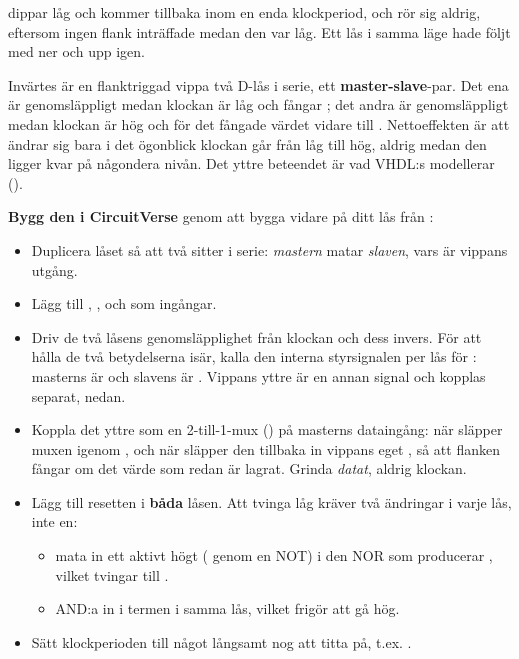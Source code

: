 
 dippar låg och kommer tillbaka inom en enda klockperiod, och  rör sig aldrig,
eftersom ingen flank inträffade medan den var låg. Ett lås i samma läge hade följt med ner och upp
igen.

Invärtes är en flanktriggad vippa två D-lås i serie, ett \textbf{master-slave}-par. Det ena är
genomsläppligt medan klockan är låg och fångar ; det andra är genomsläppligt medan klockan
är hög och för det fångade värdet vidare till . Nettoeffekten är att  ändrar sig
bara i det ögonblick klockan går från låg till hög, aldrig medan den ligger kvar på någondera
nivån. Det yttre beteendet är vad VHDL:s  modellerar
().

\textbf{Bygg den i CircuitVerse} genom att bygga vidare på ditt lås från :
\begin{itemize}
  \item Duplicera låset så att två sitter i serie: \emph{mastern} matar \emph{slaven}, vars
     är vippans utgång.
  \item Lägg till , ,  och  som ingångar.
  \item Driv de två låsens genomsläpplighet från klockan och dess invers. För att hålla de två
    betydelserna isär, kalla den interna styrsignalen per lås för : masterns
     är  och slavens är . Vippans yttre  är en
    annan signal och kopplas separat, nedan.
  \item Koppla det yttre  som en 2-till-1-mux () på masterns
    dataingång: när  släpper muxen igenom , och när 
    släpper den tillbaka in vippans eget , så att flanken fångar om det värde som redan är
    lagrat. Grinda \emph{datat}, aldrig klockan.
  \item Lägg till resetten i \textbf{båda} låsen. Att tvinga  låg kräver två ändringar i
    varje lås, inte en:
  \begin{itemize}
    \item mata in ett aktivt högt  ( genom en NOT) i den NOR som
      producerar , vilket tvingar  till .
    \item AND:a in  i termen  i samma lås, vilket frigör 
      att gå hög.
  \end{itemize}
  \item Sätt klockperioden till något långsamt nog att titta på, t.ex. .
\end{itemize}

